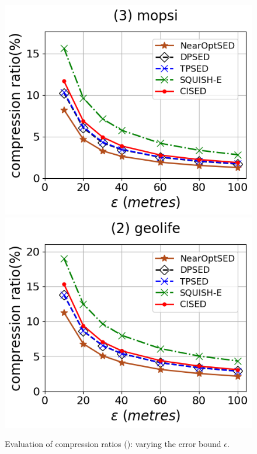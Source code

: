 \begin{figure}[tb!]
	\includegraphics[scale=0.315]{Figures/Exp-SED-CR-epsilon-mopsi.png}		\hspace{1ex}
	\includegraphics[scale=0.315]{Figures/Exp-SED-CR-epsilon-geolife.png}
	\vspace{-2.5ex}
	\caption{\small Evaluation of compression ratios (\sed): varying the error bound $\epsilon$.}
	\label{fig:cr-sed}
	\vspace{-1ex}
\end{figure}

